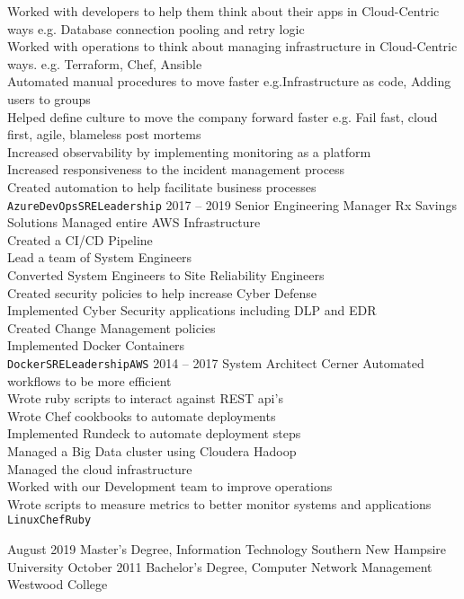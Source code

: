 \documentclass[9pt]{developercv} %
\begin{document}
\begin{entrylist}
{		Worked with developers to help them think about their apps in Cloud-Centric ways e.g. Database connection pooling and retry logic \\
		Worked with operations to think about managing infrastructure in Cloud-Centric ways. e.g. Terraform, Chef, Ansible \\
		Automated manual procedures to move faster e.g.Infrastructure as code, Adding users to groups \\
		Helped define culture to move the company forward faster e.g. Fail fast, cloud first, agile, blameless post mortems \\
		Increased observability by implementing monitoring as a platform\\
		Increased responsiveness to the incident management process\\
		Created automation to help facilitate business processes\\ 
		\texttt{Azure}\slashsep\texttt{DevOps}\slashsep\texttt{SRE}\slashsep\texttt{Leadership}}
	\entry
		{2017 -- 2019}
		{Senior Engineering Manager}
		{Rx Savings Solutions}
		{Managed entire AWS Infrastructure \\
		Created a CI/CD Pipeline \\
		Lead a team of System Engineers \\
		Converted System Engineers to Site Reliability Engineers \\
		Created security policies to help increase Cyber Defense \\
		Implemented Cyber Security applications including DLP and EDR \\
		Created Change Management policies \\
		Implemented Docker Containers\\ 
		\texttt{Docker}\slashsep\texttt{SRE}\slashsep\texttt{Leadership}\slashsep\texttt{AWS}}
	\entry
		{2014 -- 2017}
		{System Architect}
		{Cerner}
		{Automated workflows to be more efficient \\
		 Wrote ruby scripts to interact against REST api’s \\
		 Wrote Chef cookbooks to automate deployments \\
		Implemented Rundeck to automate deployment steps \\
		Managed a Big Data cluster using Cloudera Hadoop \\
		Managed the cloud infrastructure \\
		Worked with our Development team to improve operations \\
		Wrote scripts to measure metrics to better monitor systems and applications \\
		\texttt{Linux}\slashsep\texttt{Chef}\slashsep\texttt{Ruby}}
\end{entrylist}


\begin{entrylist}
	\entry
		{August 2019}
		{Master's Degree, Information Technology}
		{Southern New Hampsire University}
		{}
	\entry
		{October 2011}
		{Bachelor's Degree, Computer Network Management}
		{Westwood College}
		{}
\end{entrylist}
\end{document}
